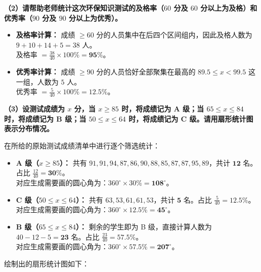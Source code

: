 \vspace{0.6cm}

\textbf{（2）请帮助老师统计这次环保知识测试的及格率（$60$ 分及 $60$ 分以上为及格）和优秀率（$90$ 分及 $90$ 分以上为优秀）。}

\vspace{0.2cm}
\begin{itemize}
  \item \textbf{及格率计算：} 成绩 $\geqslant 60$ 分的人员集中在后四个区间组内，因此及格人数为 $9 + 10 + 14 + 5 = 38$ 人。\\
  及格率 $= \frac{38}{40} \times 100\% = \boldsymbol{95\%}$。
  \item \textbf{优秀率计算：} 成绩 $\geqslant 90$ 分的人员恰好全部聚集在最高的 $89.5 \leqslant x < 99.5$ 这一组，人数为 $5$ 人。\\
  优秀率 $= \frac{5}{40} \times 100\% = \boldsymbol{12.5\%}$。
\end{itemize}

\vspace{0.6cm}

\textbf{（3）设测试成绩为 $x$ 分，当 $x \geqslant 85$ 时，将成绩记为 A 级；当 $65 \leqslant x \leqslant 84$ 时，将成绩记为 B 级；当 $50 \leqslant x \leqslant 64$ 时，将成绩记为 C 级。请用扇形统计图表示分布情况。}

\vspace{0.2cm}
在所给的原始测试成绩清单中进行逐个筛选统计：
\begin{itemize}
  \item \textbf{A 级（$x \geqslant 85$）：} 共有 $91, 91, 94, 87, 86, 90, 88, 85, 87, 87, 95, 89$，共计 $\boldsymbol{12}$ 名。占比 $\frac{12}{40} = \boldsymbol{30\%}$。\\
  对应生成需要画的圆心角为：$360^\circ \times 30\% = \boldsymbol{108^\circ}$。
  \item \textbf{C 级（$50 \leqslant x \leqslant 64$）：} 共有 $63, 53, 61, 61, 53$，共计 $\boldsymbol{5}$ 名。占比 $\frac{5}{40} = \boldsymbol{12.5\%}$。\\
  对应生成需要画的圆心角为：$360^\circ \times 12.5\% = \boldsymbol{45^\circ}$。
  \item \textbf{B 级（$65 \leqslant x \leqslant 84$）：} 剩余的学生即为 B 级，直接计算人数为 $40 - 12 - 5 = \boldsymbol{23}$ 名。占比 $\frac{23}{40} = \boldsymbol{57.5\%}$。\\
  对应生成需要画的圆心角为：$360^\circ \times 57.5\% = \boldsymbol{207^\circ}$。
\end{itemize}

绘制出的扇形统计图如下：

